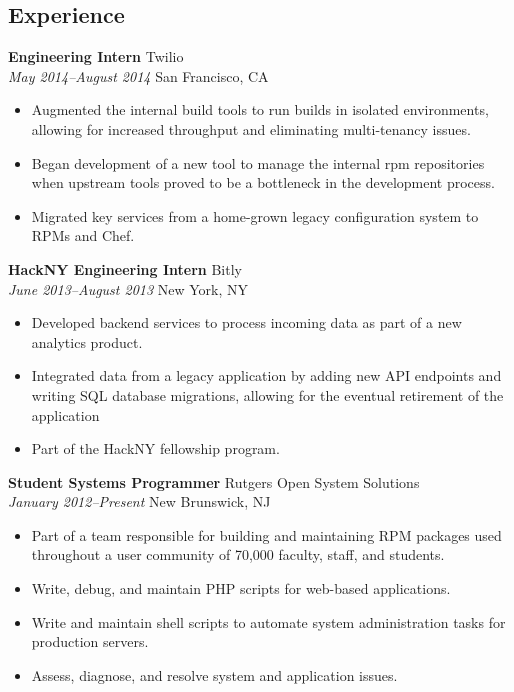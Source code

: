 \documentclass[centered,overlapped]{res}
\begin{document}

\address{153 Riveredge Road \\ Tinton Falls, NJ 07724}
\address{josh@jmatthews.us \\ github.com/jmatth}

\begin{resume}

\section{Experience}

{\bf Engineering Intern} \hfill Twilio\\
\textit{May 2014--August 2014} \hfill San Francisco, CA
\begin{itemize} \itemsep -2pt %
    \item Augmented the internal build tools to run builds in isolated
      environments, allowing for increased throughput and eliminating
      multi-tenancy issues.
    \item Began development of a new tool to manage the internal rpm
      repositories when upstream tools proved to be a bottleneck in the
      development process.
    \item Migrated key services from a home-grown legacy configuration
        system to RPMs and Chef.
\end{itemize}

{\bf HackNY Engineering Intern} \hfill Bitly\\
\textit{June 2013--August 2013} \hfill New York, NY
\begin{itemize} \itemsep -2pt %
    \item Developed backend services to process incoming data as part of a new
      analytics product.
    \item Integrated data from a legacy application by adding new API endpoints
      and writing SQL database migrations, allowing for the eventual retirement
      of the application
    \item Part of the HackNY fellowship program.
\end{itemize}

{\bf Student Systems Programmer} \hfill Rutgers Open System Solutions\\
\textit{January 2012--Present} \hfill New Brunswick, NJ
\begin{itemize} \itemsep -2pt %
	\item Part of a team responsible for building and maintaining RPM packages
    used throughout a user community of 70,000 faculty, staff, and students.
	\item Write, debug, and maintain PHP scripts for web-based applications.
  \item Write and maintain shell scripts to automate system administration tasks
    for production servers.
	\item Assess, diagnose, and resolve system and application issues.
\end{itemize}



\end{resume}
\end{document}
